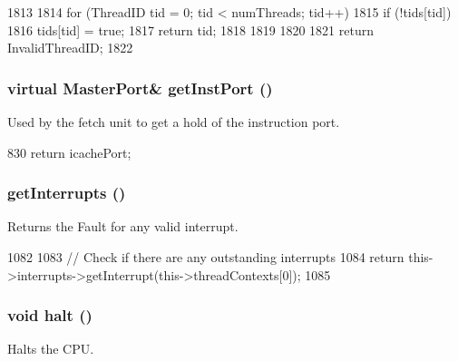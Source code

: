 \begin{DoxyCode}
1813 {
1814     for (ThreadID tid = 0; tid < numThreads; tid++) {
1815         if (!tids[tid]) {
1816             tids[tid] = true;
1817             return tid;
1818         }
1819     }
1820 
1821     return InvalidThreadID;
1822 }
\end{DoxyCode}
\hypertarget{classFullO3CPU_a40da530cb5dd380fd7fc0d786e94d5eb}{
\subsubsection[{getInstPort}]{\setlength{\rightskip}{0pt plus 5cm}virtual {\bf MasterPort}\& getInstPort ()}}
\label{classFullO3CPU_a40da530cb5dd380fd7fc0d786e94d5eb}
Used by the fetch unit to get a hold of the instruction port. 


\begin{DoxyCode}
830 { return icachePort; }
\end{DoxyCode}
\hypertarget{classFullO3CPU_aa2bbcc75bdfc0f2355cd06731e6f5d69}{
\subsubsection[{getInterrupts}]{ getInterrupts ()}}
\label{classFullO3CPU_aa2bbcc75bdfc0f2355cd06731e6f5d69}
Returns the Fault for any valid interrupt. 


\begin{DoxyCode}
1082 {
1083     // Check if there are any outstanding interrupts
1084     return this->interrupts->getInterrupt(this->threadContexts[0]);
1085 }
\end{DoxyCode}
\hypertarget{classFullO3CPU_ade0430439247877006d7df950f94918a}{
\subsubsection[{halt}]{\setlength{\rightskip}{0pt plus 5cm}void halt ()}}
\label{classFullO3CPU_ade0430439247877006d7df950f94918a}
Halts the CPU. 


